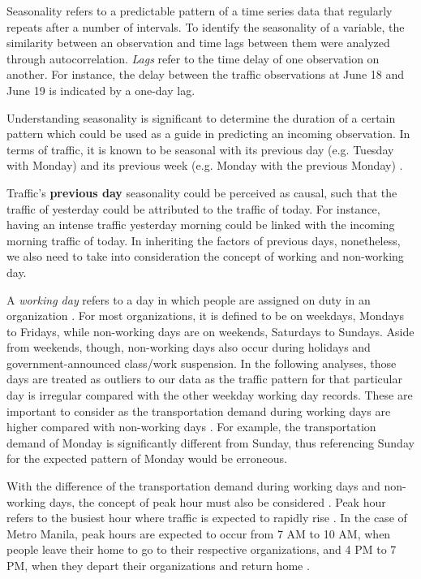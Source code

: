 Seasonality refers to a predictable pattern of a time series data that regularly repeats after a number of intervals. To identify the seasonality of a variable, the similarity between an observation and time lags between them were analyzed through autocorrelation. \textit{Lags} refer to the time delay of one observation on another. For instance, the delay between the traffic observations at June 18 and June 19 is indicated by a one-day lag.

Understanding seasonality is significant to determine the duration of a certain pattern which could be used as a guide in predicting an incoming observation. In terms of traffic, it is known to be seasonal with its previous day (e.g. Tuesday with Monday) and its previous week (e.g. Monday with the previous Monday) .

Traffic's \textbf{previous day} seasonality could be perceived as causal, such that the traffic of yesterday could be attributed to the traffic of today. For instance, having an intense traffic yesterday morning could be linked with the incoming morning traffic of today. In inheriting the factors of previous days, nonetheless, we also need to take into consideration the concept of working and non-working day.

A \textit{working day} refers to a day in which people are assigned on duty in an organization \cite{liu2008wdcm}. For most organizations, it is defined to be on weekdays, Mondays to Fridays, while non-working days are on weekends, Saturdays to Sundays. Aside from weekends, though, non-working days also occur during holidays and government-announced class/work suspension. In the following analyses, those days are treated as outliers to our data as the traffic pattern for that particular day is irregular compared with the other weekday working day records. These are important to consider as the transportation demand during working days are higher compared with non-working days \cite{traffic_trend}. For example, the transportation demand of Monday is significantly different from Sunday, thus referencing Sunday for the expected pattern of Monday would be erroneous.

With the difference of the transportation demand during working days and non-working days, the concept of peak hour must also be considered . Peak hour refers to the busiest hour where traffic is expected to rapidly rise . In the case of Metro Manila, peak hours are expected to occur from 7 AM to 10 AM, when people leave their home to go to their respective organizations, and 4 PM to 7 PM, when they depart their organizations and return home .

